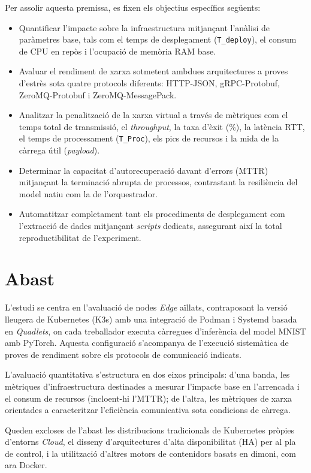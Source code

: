 Per assolir aquesta premissa, es fixen els objectius específics següents:
\begin{itemize}
    \item Quantificar l'impacte sobre la infraestructura mitjançant l'anàlisi de paràmetres base, tals com el temps de desplegament (\texttt{T\_deploy}), el consum de CPU en repòs i l'ocupació de memòria RAM base.
    \item Avaluar el rendiment de xarxa sotmetent ambdues arquitectures a proves d'estrès sota quatre protocols diferents: HTTP-JSON, gRPC-Protobuf, ZeroMQ-Protobuf i ZeroMQ-MessagePack.
    \item Analitzar la penalització de la xarxa virtual a través de mètriques com el temps total de transmissió, el \textit{throughput}, la taxa d'èxit (\%), la latència RTT, el temps de processament (\texttt{T\_Proc}), els pics de recursos i la mida de la càrrega útil (\textit{payload}).
    \item Determinar la capacitat d'autorecuperació davant d'errors (MTTR) mitjançant la terminació abrupta de processos, contrastant la resiliència del model natiu com la de l'orquestrador.
    \item Automatitzar completament tant els procediments de desplegament com l'extracció de dades mitjançant \textit{scripts} dedicats, assegurant així la total reproductibilitat de l'experiment.
\end{itemize}

\section{Abast}
L'estudi se centra en l'avaluació de nodes \textit{Edge} aïllats, contraposant la versió lleugera de Kubernetes (K3s) amb una integració de Podman i Systemd basada en \textit{Quadlets}, on cada treballador executa càrregues d'inferència del model MNIST amb PyTorch. Aquesta configuració s'acompanya de l'execució sistemàtica de proves de rendiment sobre els protocols de comunicació indicats.

L'avaluació quantitativa s'estructura en dos eixos principals: d'una banda, les mètriques d'infraestructura destinades a mesurar l'impacte base en l'arrencada i el consum de recursos (incloent-hi l'MTTR); de l'altra, les mètriques de xarxa orientades a caracteritzar l'eficiència comunicativa sota condicions de càrrega.

Queden excloses de l'abast les distribucions tradicionals de Kubernetes pròpies d'entorns \textit{Cloud}, el disseny d'arquitectures d'alta disponibilitat (HA) per al pla de control, i la utilització d'altres motors de contenidors basats en dimoni, com ara Docker.

